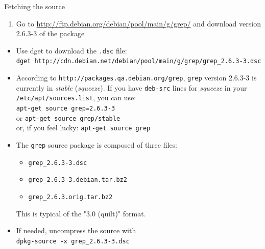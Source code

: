 \documentclass[10pt,final]{beamer}
\begin{document}
\begin{frame}{Fetching the source}
\begin{enumerate}
	\item Go to \url{http://ftp.debian.org/debian/pool/main/g/grep/} and
		download version 2.6.3-3 of the package
\end{enumerate}
\begin{itemize}
	\item Use dget to download the \texttt{.dsc} file:\\
		{\small \texttt{dget http://cdn.debian.net/debian/pool/main/g/grep/grep\_2.6.3-3.dsc}}
		\hbr
	\item According to \texttt{http://packages.qa.debian.org/grep}, \texttt{grep} version 2.6.3-3 is currently in \textsl{stable} (\textsl{squeeze}). If you have \texttt{deb-src} lines for \textsl{squeeze} in your \texttt{/etc/apt/sources.list}, you can use:\\
		\texttt{apt-get source grep=2.6.3-3}\\
		or \texttt{apt-get source grep/stable}\\
		or, if you feel lucky: \texttt{apt-get source grep}
	\hbr
	\item The \texttt{grep} source package is composed of three files:
		\begin{itemize}
			\item \texttt{grep\_2.6.3-3.dsc}
			\item \texttt{grep\_2.6.3-3.debian.tar.bz2}
			\item \texttt{grep\_2.6.3.orig.tar.bz2}
		\end{itemize}
		This is typical of the "3.0 (quilt)" format.
	\hbr
\item If needed, uncompress the source with\\
	\texttt{dpkg-source -x grep\_2.6.3-3.dsc}
\end{itemize}
\end{frame}
\end{document}
